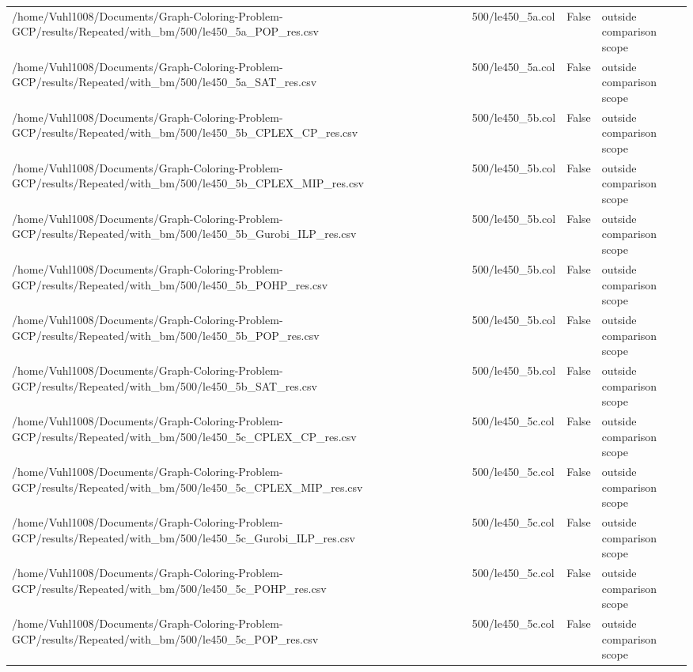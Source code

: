 \begin{table}[htbp]
\begin{tabular}{llll}
/home/Vuhl1008/Documents/Graph-Coloring-Problem-GCP/results/Repeated/with\_bm/500/le450\_5a\_POP\_res.csv & 500/le450\_5a.col & False & outside comparison scope \\
/home/Vuhl1008/Documents/Graph-Coloring-Problem-GCP/results/Repeated/with\_bm/500/le450\_5a\_SAT\_res.csv & 500/le450\_5a.col & False & outside comparison scope \\
/home/Vuhl1008/Documents/Graph-Coloring-Problem-GCP/results/Repeated/with\_bm/500/le450\_5b\_CPLEX\_CP\_res.csv & 500/le450\_5b.col & False & outside comparison scope \\
/home/Vuhl1008/Documents/Graph-Coloring-Problem-GCP/results/Repeated/with\_bm/500/le450\_5b\_CPLEX\_MIP\_res.csv & 500/le450\_5b.col & False & outside comparison scope \\
/home/Vuhl1008/Documents/Graph-Coloring-Problem-GCP/results/Repeated/with\_bm/500/le450\_5b\_Gurobi\_ILP\_res.csv & 500/le450\_5b.col & False & outside comparison scope \\
/home/Vuhl1008/Documents/Graph-Coloring-Problem-GCP/results/Repeated/with\_bm/500/le450\_5b\_POHP\_res.csv & 500/le450\_5b.col & False & outside comparison scope \\
/home/Vuhl1008/Documents/Graph-Coloring-Problem-GCP/results/Repeated/with\_bm/500/le450\_5b\_POP\_res.csv & 500/le450\_5b.col & False & outside comparison scope \\
/home/Vuhl1008/Documents/Graph-Coloring-Problem-GCP/results/Repeated/with\_bm/500/le450\_5b\_SAT\_res.csv & 500/le450\_5b.col & False & outside comparison scope \\
/home/Vuhl1008/Documents/Graph-Coloring-Problem-GCP/results/Repeated/with\_bm/500/le450\_5c\_CPLEX\_CP\_res.csv & 500/le450\_5c.col & False & outside comparison scope \\
/home/Vuhl1008/Documents/Graph-Coloring-Problem-GCP/results/Repeated/with\_bm/500/le450\_5c\_CPLEX\_MIP\_res.csv & 500/le450\_5c.col & False & outside comparison scope \\
/home/Vuhl1008/Documents/Graph-Coloring-Problem-GCP/results/Repeated/with\_bm/500/le450\_5c\_Gurobi\_ILP\_res.csv & 500/le450\_5c.col & False & outside comparison scope \\
/home/Vuhl1008/Documents/Graph-Coloring-Problem-GCP/results/Repeated/with\_bm/500/le450\_5c\_POHP\_res.csv & 500/le450\_5c.col & False & outside comparison scope \\
/home/Vuhl1008/Documents/Graph-Coloring-Problem-GCP/results/Repeated/with\_bm/500/le450\_5c\_POP\_res.csv & 500/le450\_5c.col & False & outside comparison scope \\

\end{tabular}
\end{table}
